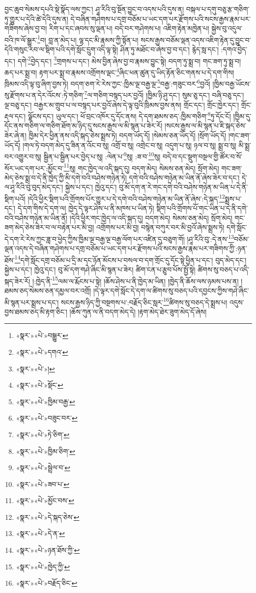 བྱང་ཆུབ་སེམས་དཔའི་སྡེ་སྣོད་ལས་ཀྱང་། ཤཱ་རིའི་བུ་སྔོན་བྱུང་བ་འདས་པའི་དུས་ན། བསྐལ་པ་དགུ་བཅུ་རྩ་གཅིག་ཏུ་གྱུར་པ་དེའི་ཚེ་དེའི་དུས་ན། དེ་བཞིན་གཤེགས་པ་དགྲ་བཅོམ་པ་ཡང་དག་པར་རྫོགས་པའི་སངས་རྒྱས་རྣམ་པར་གཟིགས་ཞེས་བྱ་བ། རིག་པ་དང་ཞབས་སུ་ལྡན་པ། བདེ་བར་གཤེགས་པ། འཇིག་རྟེན་མཁྱེན་པ། སྐྱེས་བུ་འདུལ་བའི་ཁ་ལོ་སྒྱུར་\footnote{«སྣར་»«པེ་»བསྒྱུར་}བ། བླ་ན་མེད་པ། ལྷ་དང་མི་རྣམས་ཀྱི་སྟོན་པ། སངས་རྒྱས་བཅོམ་ལྡན་འདས་འཇིག་རྟེན་དུ་བྱུང་བ་དེའི་གསུང་རབ་ལ་སྡིག་པའི་དགེ་སློང་དྲུག་འདི་ལྟ་སྟེ། ཤིན་ཏུ་མཐོང་བ་ཞེས་བྱ་བ་དང་། རྙེད་སླ་དང་། :དགའ་བྱེད་དང་། དགེ་\footnote{«སྣར་»«པེ་»དགའ་}བྱེད་དང་། \footnote{«སྣར་»«པེ་»།  }གྲགས་པ་དང་། མེས་བྱིན་ཞེས་བྱ་བ་རྣམས་བྱུང་སྟེ། བདག་ཏུ་སྨྲ་བ། གང་ཟག་ཏུ་སྨྲ་བ། ཆད་པར་སྨྲ་བ། རྟག་པར་སྨྲ་བ་རྣམས་འགྲོགས་ལྡང་\footnote{«སྣར་»«པེ་»སྡོང་}ཞིང་ཕན་ཚུན་དུ་ཡིད་རྟོན་ཅིང་གནས་པ་དེ་དག་གིས། ཁྲིམས་འདི་ལྟ་བུ་ཞིག་བྱས་ཏེ། བདག་ཅག་རེ་རེས་ཀྱང་:ཁྱིམ་ལྔ་བརྒྱ་ལྔ་\footnote{«སྣར་»«པེ་»ཁྱིམ་བརྒྱ་}བརྒྱ་:གཟུང་བར་\footnote{«སྣར་»«པེ་»བཟུང་བར་}བྱའོ། །ཁྱིམ་བརྒྱ་ཡོངས་སུ་རྫོགས་པ་ན་དེར་འོངས་:ཏེ་གཅིག་\footnote{«སྣར་»«པེ་»ཏེ་ཅིག་}ལ་གཅིག་བསྙད་པར་བྱའོ། །ཁྱིམ་ཉི་ཤུ་དང་། སུམ་ཅུ་དང་། བཞི་བཅུ་དང་། ལྔ་བཅུ་དང་། བརྒྱར་མ་གྲུབ་པ་ལ་བསྙད་པར་བྱའོ་ཞེས་དེ་ལྟ་བུའི་ཁྲིམས་བྱས་ནས། གྲོང་དང་། གྲོང་ཁྱེར་དང་། གྲོང་རྡལ་དང་། ལྗོངས་དང་། ཡུལ་དང་། ཕོ་བྲང་འཁོར་དུ་དོང་ནས། དེ་དག་ཐམས་ཅད་:ཁྱིམ་གཅིག་\footnote{«སྣར་»«པེ་»ཁྱིམ་ཅིག་}ཏུ་དོང་ངོ། །ཁྱིམ་དུ་དོང་ནས་གཅིག་ལ་གཅིག་ཐོག་མ་ཉིད་དུ་སངས་རྒྱས་ལ་མི་སྙན་པ་ཟེར་རོ། །སངས་རྒྱས་ལ་མི་སྙན་པ་ཇི་སྐད་ཅེས་ཟེར་ཞེ་ན། ཁྱིམ་དེར་ཕྱིན་ནས་འདི་སྐད་ཅེས་སྨྲས་ཏེ། བདག་ཡོད་དོ། །སེམས་ཅན་ཡོད་དོ། །སྲོག་ཡོད་དོ། །གང་ཟག་ཡོད་དོ། །གལ་ཏེ་བདག་མེད་དུ་ཟིན་ན་འོང་བ་སུ། འགྲོ་བ་སུ། འགྲེང་བ་སུ། འདུག་པ་སུ། ཉལ་བ་སུ། སྨྲ་བ་སུ། མི་སྨྲ་བར་འགྱུར་བ་སུ། སྦྱིན་པ་སྦྱིན་པར་བྱེད་པ་སུ། :ལེན་པ་\footnote{«སྣར་»«པེ་»སྦྲེལ་བ་}སུ། :ཟ་བ་\footnote{«སྣར་»«པེ་»ཟབ་པ་}སུ། བདེ་བ་དང་སྡུག་བསྔལ་གྱི་ཚོར་བ་སོ་སོར་ཡང་དག་པར་:མྱོང་བ་\footnote{«སྣར་»«པེ་»མྱོང་བས་}སུ། གང་ཁྱེད་ལ་འདི་སྐད་དུ། བདག་མེད། སེམས་ཅན་མེད། སྲོག་མེད། གང་ཟག་མེད་ཅེས་སྨྲ་བ་དེ་ནི་ཁྱེད་ཀྱི་མི་དགེ་བའི་བཤེས་གཉེན་ཏེ། དགེ་བའི་བཤེས་གཉེན་མ་ཡིན་ནོ་ཞེས་ཟེར་བ་དང་། དེ་ལ་ཤཱ་རིའི་བུ་བུད་མེད་དང་། སྐྱེས་པ་དང་། ཁྱེའུ་དང་། བུ་མོ་དག་ན་རེ་གང་དགེ་བའི་བཤེས་གཉེན་མ་ཡིན་པ་དེ་ནི་སྡིག་པའོ། །དེའི་ཕྱིར་སྡིག་པའི་གྲོགས་པོར་གྱུར་པ་དེ་དགེ་བའི་བཤེས་གཉེན་མ་ཡིན་ནོ་ཞེས་:དེ་སྐད་\footnote{«སྣར་»«པེ་»དེ་སྐད་ཅེས་}སྨྲས་པ་དང་། དེ་དག་གིས་དེ་དག་ལ། ཁྱེད་དེ་ལྟར་ཤེས་པ་ནི་མཁས་པ་ཡིན་ཏེ། སྡིག་པའི་གྲོགས་པོ་གང་ཡིན་པ་དེ་ནི་དགེ་བའི་བཤེས་གཉེན་མ་ཡིན་ནོ། །དེའི་ཕྱིར་གང་ཁྱེད་ལ་འདི་སྐད་དུ། བདག་མེད། སེམས་ཅན་མེད། སྲོག་མེད། གང་ཟག་མེད་ཅེས་ཟེར་བ་ལ་བརྟེན་པར་མི་བྱ། འགྲོགས་པར་མི་བྱ། བསྙེན་བཀུར་བར་མི་བྱའོ་ཞེས་སྨྲས་ཏེ། དགེ་སློང་དེ་དག་རེ་རེས་ཀྱང་ཟླ་བ་ཕྱེད་ཀྱིས་ཁྱིམ་ལྔ་བརྒྱ་ལྔ་བརྒྱ་ལོག་པར་འཛིན་དུ་བཅུག་གོ། །ཤཱ་རིའི་བུ་:དེ་ནས་\footnote{«སྣར་»«པེ་»དེ་ན་}བཅོམ་ལྡན་འདས་དེ་བཞིན་གཤེགས་པ་དགྲ་བཅོམ་པ་ཡང་དག་པར་རྫོགས་པའི་སངས་རྒྱས་རྣམ་པར་གཟིགས་ཀྱི་:ཉན་ཐོས་\footnote{«སྣར་»«པེ་»ཉན་ཐོས་ཀྱི་}དགེ་སློང་དགྲ་བཅོམ་པ་དྲི་མ་དང་ཉོན་མོངས་པ་བསལ་བ་དག་གྲོང་དུ་དོང་སྟེ་ཕྱིན་པ་དང་། བུད་མེད་དང་། སྐྱེས་པ་དང་། ཁྱེའུ་དང་། བུ་མོ་དག་གཤེ་ཞིང་མི་སྙན་པ་ཟེར། ཚིག་ངན་པ་རྩུབ་པོས་སྤྱོ་སྟེ། ཚིགས་སུ་བཅད་པ་འདི་སྐད་ཟེར་རོ། །:ཁྱེད་ནི་\footnote{«སྣར་»«པེ་»ཁྱེད་ཀྱི་}ལམ་ལ་རྨོངས་པ་སྟེ། །ཆོས་ཤེས་པ་ནི་ཁྱེད་མ་ཡིན། །ཁྱེད་ནི་ཆོས་ལས་ཉམས་པས་ན། །ཐམས་ཅད་སེམས་ཅན་དམྱལ་བར་འགྲོ། །དེ་ལྟར་དགེ་སློང་དེ་དག་ལ་ཚིགས་སུ་བཅད་པའི་དབྱངས་ཀྱིས་གཤེ་ཞིང་མི་སྙན་པར་སྨྲས་པ་དང་། སངས་རྒྱས་ཉིད་ཀྱི་བསྔགས་པ་:བརྗོད་ཅིང་སླར་\footnote{«སྣར་»«པེ་»བརྗོད་ཅིང་}ཚིགས་སུ་བཅད་དེ་སྨྲས་པ། འདུས་བྱས་ཐམས་ཅད་མི་རྟག་ཅིང་། །ཆོས་ཀུན་ལ་ནི་བདག་མེད་དེ། །རྟག་མེད་ཐེར་ཟུག་མེད་དོ་ཞེས། 